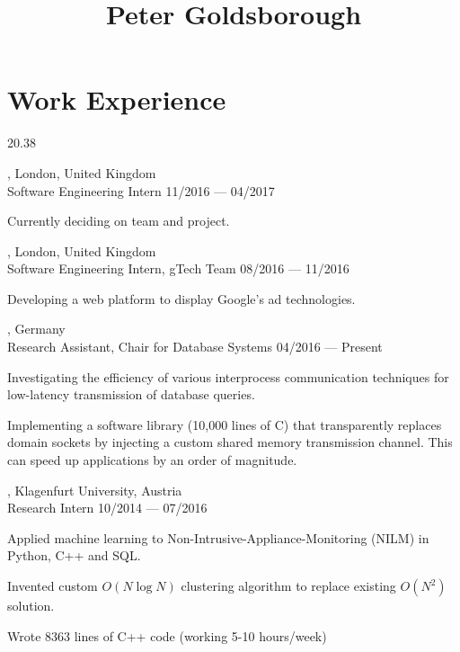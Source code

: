 




\begin{header}
	\title{Peter Goldsborough}
	\separate
	\separate
\end{header}

\section{Work Experience}{2}{0.38}

\begin{entry}
	{, London, United Kingdom}
	{\\Software Engineering Intern}
	{11/2016 --- 04/2017}
	\item Currently deciding on team and project.
\end{entry}

\begin{entry}
	{, London, United Kingdom}
	{\\Software Engineering Intern, gTech Team}
	{08/2016 --- 11/2016}
	\item Developing a web platform to display Google's ad technologies.
\end{entry}

\begin{entry}
	{, Germany}
	{\\Research Assistant, Chair for Database Systems}
	{04/2016 --- Present}

  \item Investigating the efficiency of various interprocess communication techniques for low-latency transmission of database queries.
  \item Implementing a software library (10,000 lines of C) that transparently replaces domain sockets by injecting a custom shared memory transmission channel. This can speed up applications by an order of magnitude.
\end{entry}

\begin{entry}
	{, Klagenfurt University, Austria}
	{\\Research Intern}
	{10/2014 --- 07/2016}

\item Applied machine learning to Non-Intrusive-Appliance-Monitoring (NILM) in Python, C++ and SQL.
	\item Invented custom $O(N \log N)$ clustering algorithm to replace existing $O(N^2)$ solution.
	\item Wrote 8363 lines of C++ code (working 5-10 hours/week)
\end{entry}

